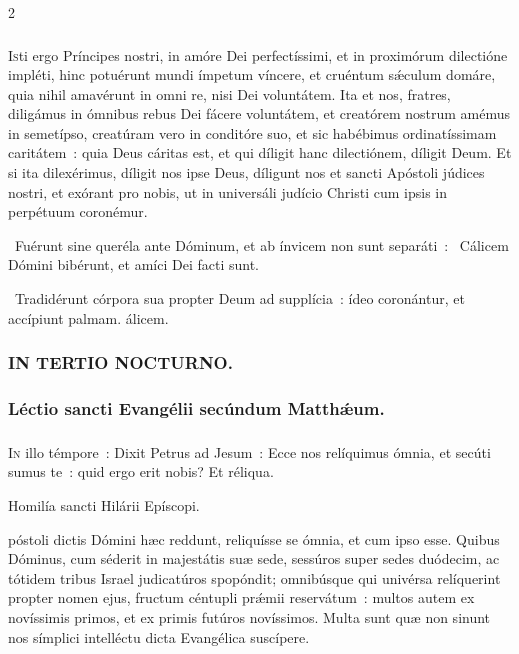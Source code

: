 \documentclass[9pt,twoside]{extarticle}
\begin{document}
\begin{multicols}{2}
{\subsubsection*{\center {}}
\lettrine{I}sti ergo Príncipes nostri, in amóre Dei perfectíssimi, et in proximórum dilectióne impléti, hinc potuérunt mundi ímpetum víncere, et cruéntum sǽculum domáre, quia nihil amavérunt in omni re, nisi Dei voluntátem. Ita et nos, fratres, diligámus in ómnibus rebus Dei fácere voluntátem, et creatórem nostrum amémus in semetípso, creatúram vero in conditóre suo, et sic habébimus ordinatíssimam caritátem~: quia Deus cáritas est, et qui díligit hanc dilectiónem, díligit Deum. Et si ita dilexérimus, díligit nos ipse Deus, díligunt nos et sancti Apóstoli júdices nostri, et exórant pro nobis, ut in universáli judício Christi cum ipsis in perpétuum coronémur.

\begin{tightlist}{}
\item {}~Fuérunt sine queréla ante Dóminum, et ab ínvicem non sunt separáti~: \textred{*}~Cálicem Dómini bibérunt, et amíci Dei facti sunt.
\item {}~Tradidérunt córpora sua propter Deum ad supplícia~: ídeo coronántur, et accípiunt palmam. álicem.
\end{tightlist}

\subsubsection*{\center \textsc{IN TERTIO NOCTURNO.}}
\subsubsection*{\center Léctio sancti Evangélii secúndum Matthǽum.}
\subsubsection*{\center {}}
\lettrine{I}n illo témpore~: Dixit Petrus ad Jesum~: Ecce nos relíquimus ómnia, et secúti sumus te~: quid ergo erit nobis? Et réliqua.

\begin{center}Homilía sancti Hilárii Epíscopi.\\
\end{center}
póstoli dictis Dómini hæc reddunt, reliquísse se ómnia, et cum ipso esse. Quibus Dóminus, cum séderit in majestátis suæ sede, sessúros super sedes duódecim, ac tótidem tribus Israel judicatúros spopóndit; omnibúsque qui univérsa relíquerint propter nomen ejus, fructum céntupli prǽmii reservátum~: multos autem ex novíssimis primos, et ex primis futúros novíssimos. Multa sunt quæ non sinunt nos símplici intelléctu dicta Evangélica suscípere.

}
\end{multicols}
\end{document}
